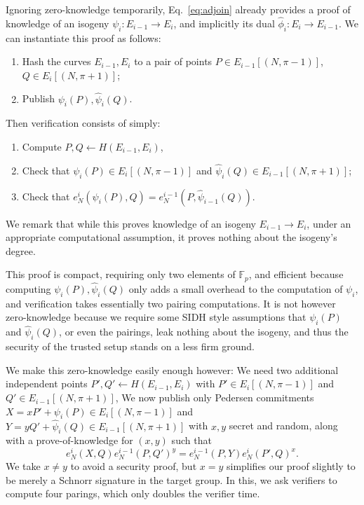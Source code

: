 \documentclass{llncs}
\newcommand{\F}{\mathbb{F}}
\begin{document}
\smallskip

Ignoring zero-knowledge temporarily, Eq.~\eqref{eq:adjoin} already
provides a proof of knowledge of an isogeny $\psi_i:E_{i-1} \to E_i$,
and implicitly its dual $\hat\phi_i: E_i \to E_{i-1}$.  
We can instantiate this proof as follows:
\begin{enumerate}
\item Hash the curves $E_{i-1},E_i$ to a pair of points
  $P\in E_{i-1}[(N,\pi-1)]$, $Q\in E_i[(N,\pi+1)]$;
\item Publish $\psi_i(P), \hat\psi_i(Q)$.
\end{enumerate}
Then verification consists of simply:
\begin{enumerate}
\item Compute $P,Q\gets H(E_{i-1},E_i)$,
\item Check that $\psi_i(P)\in E_i[(N,\pi-1)]$ and
  $\hat\psi_i(Q)\in E_{i-1}[(N,\pi+1)]$;
\item Check that
  $e_N^i(\psi_i(P),Q) = e_N^{i-1}(P,\hat\psi_{i-1}(Q))$.
\end{enumerate}
We remark that while this proves knowledge of an isogeny
$E_{i-1} \to E_i$, under an appropriate computational assumption,
it proves nothing about the isogeny's degree.

This proof is compact, requiring only two elements of $\F_p$,
and efficient because computing $\psi_i(P),\hat\psi_i(Q)$ only adds a
small overhead to the computation of $\psi_i$, and 
verification takes essentially two pairing computations. %
It is not however zero-knowledge because we require some SIDH style
assumptions that $\psi_i(P)$ and $\hat\psi_i(Q)$, or even the
pairings, leak nothing about the isogeny, and thus the security of
the trusted setup stands on a less firm ground.

We make this zero-knowledge easily enough however: 
We need two additional independent points
$P',Q' \gets H(E_{i-1},E_i)$ with
 $P' \in E_i[(N,\pi-1)]$ and $Q' \in E_{i-1}[(N,\pi+1)]$,
We now publish only Pedersen commitments 
 $X = x P' + \psi_i(P) \in E_i[(N,\pi-1)]$ and
 $Y = y Q' + \hat\psi_i(Q) \in E_{i-1}[(N,\pi+1)]$
 with $x,y$ secret and random,
along with a prove-of-knowledge for $(x,y)$ such that 
  $$ e_N^i(X,Q) e_N^{i-1}(P,Q')^y  = e_N^{i-1}(P,Y) e_N^i(P',Q)^x . $$
We take $x \ne y$ to avoid a security proof, but $x=y$ simplifies
our proof slightly to be merely a Schnorr signature in the target group.
In this, we ask verifiers to compute four parings, which only doubles
the verifier time.
\end{document}
